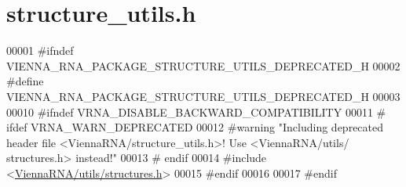 \hypertarget{structure__utils_8h_source}{}\section{structure\+\_\+utils.\+h}
\label{structure__utils_8h_source}

\begin{DoxyCode}
00001 \textcolor{preprocessor}{#ifndef VIENNA\_RNA\_PACKAGE\_STRUCTURE\_UTILS\_DEPRECATED\_H}
00002 \textcolor{preprocessor}{#define VIENNA\_RNA\_PACKAGE\_STRUCTURE\_UTILS\_DEPRECATED\_H}
00003 
00010 \textcolor{preprocessor}{#ifndef VRNA\_DISABLE\_BACKWARD\_COMPATIBILITY}
00011 \textcolor{preprocessor}{# ifdef VRNA\_WARN\_DEPRECATED}
00012 \textcolor{preprocessor}{#warning "Including deprecated header file <ViennaRNA/structure\_utils.h>! Use <ViennaRNA/utils/
      structures.h> instead!"}
00013 \textcolor{preprocessor}{# endif}
00014 \textcolor{preprocessor}{#include <\hyperlink{utils_2structures_8h}{ViennaRNA/utils/structures.h}>}
00015 \textcolor{preprocessor}{#endif}
00016 
00017 \textcolor{preprocessor}{#endif}
\end{DoxyCode}
